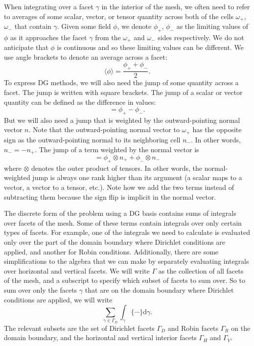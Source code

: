 \documentclass[gmd, manuscript]{copernicus}
\begin{document}
When integrating over a facet $\gamma$ in the interior of the mesh, we often need to refer to averages of some scalar, vector, or tensor quantity across both of the cells $\omega_+$, $\omega_-$ that contain $\gamma$.
Given some field $\phi$, we denote $\phi_+$, $\phi_-$ as the limiting values of $\phi$ as it approaches the facet $\gamma$ from the $\omega_+$ and $\omega_-$ sides respectively.
We do not anticipate that $\phi$ is continuous and so these limiting values can be different.
We use angle brackets to denote an average across a facet:
\begin{equation}
    \langle\phi\rangle = \frac{\phi_+ + \phi_-}{2}.
\end{equation}
To express DG methods, we will also need the jump of some quantity across a facet.
The jump is written with square brackets.
The jump of a scalar or vector quantity can be defined as the difference in values:
\begin{equation}
    [\phi] = \phi_+ - \phi_-.
\end{equation}
But we will also need a jump that is weighted by the outward-pointing normal vector $n$.
Note that the outward-pointing normal vector to $\omega_+$ has the opposite sign as the outward-pointing normal to its neighboring cell $n_-$.
In other words, $n_- = -n_+$.
The jump of a term weighted by the normal vector is
\begin{equation}
    [\phi\otimes n] = \phi_+\otimes n_+ + \phi_-\otimes n_-
\end{equation}
where $\otimes$ denotes the outer product of tensors.
In other words, the normal-weighted jump is always one rank higher than its argument (a scalar maps to a vector, a vector to a tensor, etc.).
Note how we add the two terms instead of subtracting them because the sign flip is implicit in the normal vector.

The discrete form of the problem using a DG basis contains sums of integrals over facets of the mesh.
Some of these terms contain integrals over only certain types of facets.
For example, one of the integrals we need to calculate is evaluated only over the part of the domain boundary where Dirichlet conditions are applied, and another for Robin conditions.
Additionally, there are some simplifications to the algebra that we can make by separately evaluating integrals over horizontal and vertical facets.
We will write $\Gamma$ as the collection of all facets of the mesh, and a subscript to specify which subset of facets to sum over.
So to sum over only the facets $\gamma$ that are on the domain boundary where Dirichlet conditions are applied, we will write
\begin{equation}
    \sum_{\gamma \in \Gamma_D}\int_\gamma\big\{\cdots\big\}\mathrm d\gamma.
\end{equation}
The relevant subsets are the set of Dirichlet facets $\Gamma_D$ and Robin facets $\Gamma_R$ on the domain boundary, and the horizontal and vertical interior facets $\Gamma_H$ and $\Gamma_V$.
\end{document}
